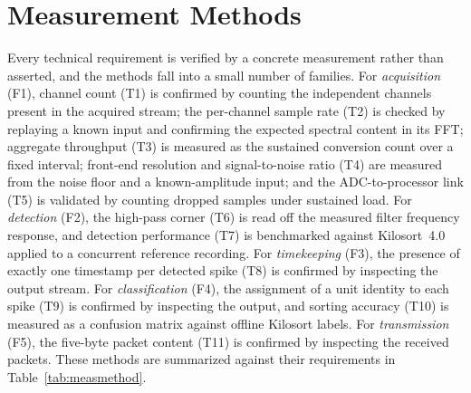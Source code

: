 \section*{Measurement Methods}

Every technical requirement is verified by a concrete measurement rather than
asserted, and the methods fall into a small number of families. For
\emph{acquisition} (F1), channel count (T1) is confirmed by counting the
independent channels present in the acquired stream; the per-channel sample rate
(T2) is checked by replaying a known input and confirming the expected spectral
content in its FFT; aggregate throughput (T3) is measured as the sustained
conversion count over a fixed interval; front-end resolution and signal-to-noise
ratio (T4) are measured from the noise floor and a known-amplitude input; and the
ADC-to-processor link (T5) is validated by counting dropped samples under
sustained load. For \emph{detection} (F2), the high-pass corner (T6) is read off
the measured filter frequency response, and detection performance (T7) is
benchmarked against Kilosort~4.0 applied to a concurrent reference recording. For
\emph{timekeeping} (F3), the presence of exactly one timestamp per detected spike
(T8) is confirmed by inspecting the output stream. For \emph{classification}
(F4), the assignment of a unit identity to each spike (T9) is confirmed by
inspecting the output, and sorting accuracy (T10) is measured as a confusion
matrix against offline Kilosort labels. For \emph{transmission} (F5), the
five-byte packet content (T11) is confirmed by inspecting the received packets.
These methods are summarized against their requirements in
Table~\ref{tab:measmethod}.

